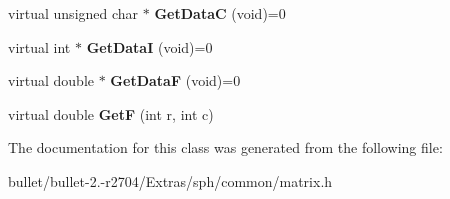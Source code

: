 \begin{DoxyCompactItemize}
\item 
\hypertarget{class_matrix_aa6fb9e96b9d79e0d3efb68aed102bf04}{virtual unsigned char $\ast$ {\bfseries Get\+Data\+C} (void)=0}\label{class_matrix_aa6fb9e96b9d79e0d3efb68aed102bf04}

\item 
\hypertarget{class_matrix_a4e121eed49bb4bdc2d7bcf25fefb91d4}{virtual int $\ast$ {\bfseries Get\+Data\+I} (void)=0}\label{class_matrix_a4e121eed49bb4bdc2d7bcf25fefb91d4}

\item 
\hypertarget{class_matrix_ab2cd11a866c972233d4016fa3e71900f}{virtual double $\ast$ {\bfseries Get\+Data\+F} (void)=0}\label{class_matrix_ab2cd11a866c972233d4016fa3e71900f}

\item 
\hypertarget{class_matrix_a49c1d204c72a48f26ada3b4e45341d98}{virtual double {\bfseries Get\+F} (int r, int c)}\label{class_matrix_a49c1d204c72a48f26ada3b4e45341d98}

\end{DoxyCompactItemize}


The documentation for this class was generated from the following file\+:\begin{DoxyCompactItemize}
\item 
bullet/bullet-\/2.-\/r2704/\+Extras/sph/common/matrix.\+h\end{DoxyCompactItemize}

